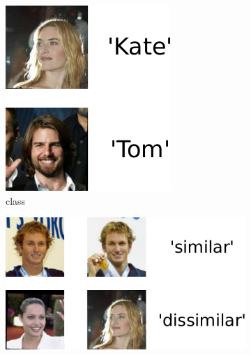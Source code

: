 \documentclass[twoside,11pt]{article}
\begin{document}




\begin{figure}[t]
    \centering
    \begin{subfigure}[t]{0.12\textwidth} %
        \centering \includegraphics[scale=0.35]{labels.pdf}
        \caption{class}\label{fig:full}
    \end{subfigure}
    \begin{subfigure}[t]{0.20\textwidth}
        \centering \includegraphics[scale=0.35]{pairs.pdf}

\end{subfigure}
\end{figure}
\end{document}
